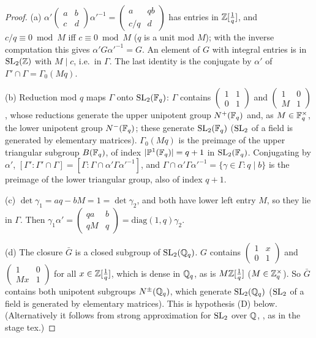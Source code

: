 \begin{proof}
(a) $\alpha'(\begin{smallmatrix}a&b\\c&d\end{smallmatrix})\alpha'^{-1}=(\begin{smallmatrix}a&qb\\c/q&d\end{smallmatrix})$ has entries in $\mathbb{Z}[\frac1q]$, and $c/q\equiv0\bmod M$ iff
$c\equiv0\bmod M$ ($q$ is a unit mod $M$); with the inverse computation this gives $\alpha'G\alpha'^{-1}=G$. An element of $G$ with integral entries is in
$\mathrm{SL}_2(\mathbb{Z})$ with $M\mid c$, i.e.\ in $\Gamma$. The last identity is the conjugate by $\alpha'$ of $\Gamma'\cap\Gamma=\Gamma_0(Mq)$.

(b) Reduction mod $q$ maps $\Gamma$ onto $\mathrm{SL}_2(\mathbb{F}_q)$: $\Gamma$ contains $\left(\begin{smallmatrix}1&1\\0&1\end{smallmatrix}\right)$ and
$\left(\begin{smallmatrix}1&0\\M&1\end{smallmatrix}\right)$, whose reductions generate the upper unipotent group $N^+(\mathbb{F}_q)$ and, as $M\in\mathbb{F}_q^\times$, the lower
unipotent group $N^-(\mathbb{F}_q)$; these generate $\mathrm{SL}_2(\mathbb{F}_q)$ ($\mathrm{SL}_2$ of a field is generated by elementary matrices). $\Gamma_0(Mq)$ is the preimage of the upper triangular subgroup $B(\mathbb{F}_q)$, of index
$|\mathbb P^1(\mathbb{F}_q)|=q+1$ in $\mathrm{SL}_2(\mathbb{F}_q)$. Conjugating by $\alpha'$, $[\Gamma':\Gamma'\cap\Gamma]=[\Gamma:\Gamma\cap\alpha'\Gamma\alpha'^{-1}]$, and
$\Gamma\cap\alpha'\Gamma\alpha'^{-1}=\{\gamma\in\Gamma:q\mid b\}$ is the preimage of the lower triangular group, also of index $q+1$.

(c) $\det\gamma_1=aq-bM=1=\det\gamma_2$, and both have lower left entry $M$, so they lie in $\Gamma$. Then
$\gamma_1\alpha'=\left(\begin{smallmatrix}qa&b\\qM&q\end{smallmatrix}\right)=\mathrm{diag}(1,q)\gamma_2$.

(d) The closure $\bar G$ is a closed subgroup of $\mathrm{SL}_2(\mathbb{Q}_q)$. $G$ contains $\left(\begin{smallmatrix}1&x\\0&1\end{smallmatrix}\right)$ and
$\left(\begin{smallmatrix}1&0\\Mx&1\end{smallmatrix}\right)$ for all $x\in\mathbb{Z}[\frac1q]$, which is dense in $\mathbb{Q}_q$, as is $M\mathbb{Z}[\frac1q]$ ($M\in\mathbb{Z}_q^\times$). So $\bar G$ contains both
unipotent subgroups $N^\pm(\mathbb{Q}_q)$, which generate $\mathrm{SL}_2(\mathbb{Q}_q)$ ($\mathrm{SL}_2$ of a field is generated by elementary matrices). This is hypothesis (D) below. (Alternatively it follows
from strong approximation for $\mathrm{SL}_2$ over $\mathbb{Q}$, , as in the stage tex.)
\end{proof}

